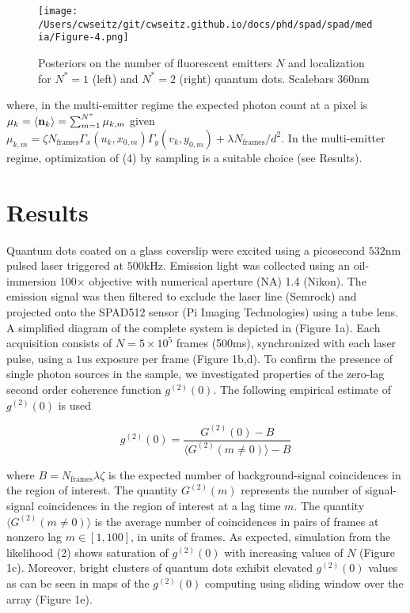 \begin{figure}[t]
\centering
\texttt{[image: /Users/cwseitz/git/cwseitz.github.io/docs/phd/spad/spad/media/Figure-4.png]}
\caption{Posteriors on the number of fluorescent emitters $N$ and localization for $N^{*}=1$ (left) and $N^{*}=2$ (right) quantum dots. Scalebars 360nm}
\end{figure}   

where, in the multi-emitter regime the expected photon count at a pixel is $\mu_{k} = \langle \bold{n}_k\rangle =\sum_{m=1}^{N^{*}} \mu_{k,m}$ given $\mu_{k,m}=\zeta N_{\mathrm{frames}}\Gamma_{x}(u_k,x_{0,m})\Gamma_{y}(v_k,y_{0,m}) + \lambda N_{\mathrm{frames}}/d^{2}$. In the multi-emitter regime, optimization of (4) by sampling is a suitable choice (see Results). 


\section{Results}

Quantum dots coated on a glass coverslip were excited using a picosecond $532\mathrm{nm}$ pulsed laser triggered at $500\mathrm{kHz}$. Emission light was collected using an oil-immersion 100$\times$ objective with numerical aperture (NA) 1.4 (Nikon). The emission signal was then filtered to exclude the laser line (Semrock) and projected onto the SPAD512 sensor (Pi Imaging Technologies) using a tube lens. A simplified diagram of the complete system is depicted in (Figure 1a). Each acquisition consists of $N=5\times 10^{5}$ frames (500ms), synchronized with each laser pulse, using a $1\mathrm{us}$ exposure per frame (Figure 1b,d). To confirm the presence of single photon sources in the sample, we investigated properties of the zero-lag second order coherence function $g^{(2)}(0)$. The following empirical estimate of $g^{(2)}(0)$ is used \parencite{Israel2017}

\begin{equation}
g^{(2)}(0) = \frac{G^{(2)}(0)-B}{\langle G^{(2)}(m\neq 0)\rangle -B}
\end{equation}

where $B = N_{\mathrm{frames}}\lambda\zeta$ is the expected number of background-signal coincidences in the region of interest. The quantity $G^{(2)}(m)$ represents the number of signal-signal coincidences in the region of interest at a lag time $m$. The quantity $\langle G^{(2)}(m\neq 0)\rangle$ is the average number of coincidences in pairs of frames at nonzero lag $m \in [1,100]$, in units of frames. As expected, simulation from the likelihood (2) shows saturation of $g^{(2)}(0)$  with increasing values of $N$ (Figure 1c). Moreover, bright clusters of quantum dots exhibit elevated $g^{(2)}(0)$ values as can be seen in maps of the $g^{(2)}(0)$ computing using sliding window over the array (Figure 1e).

